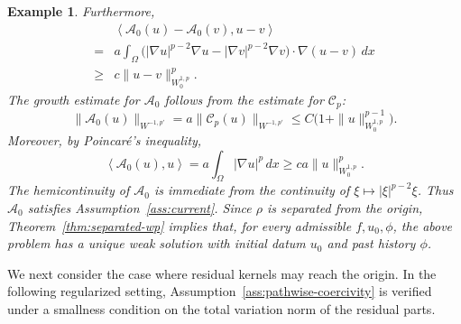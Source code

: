 \documentclass[a4paper,11pt,oneside,reqno]{amsart}
\newtheorem{example}[theorem]{Example}
\newcounter{c}
\newcounter{d}
\newcounter{b}
\newcommand{\dual}[2]{\left\langle #1,#2\right\rangle}
\begin{document}
\begin{example}
Furthermore,
\[
\begin{aligned}
&\dual{\mathcal A_0(u)-\mathcal A_0(v)}{u-v}  \\
={}&
 a\int_\Omega
 \bigl(
 |\nabla u|^{p-2}\nabla u
 -
 |\nabla v|^{p-2}\nabla v
 \bigr)\cdot\nabla(u-v)\,dx  \\
\ge{}&
c\|u-v\|_{W^{1,p}_0}^{p}.
\end{aligned}
\]
The growth estimate for \(\mathcal A_0\) follows from the estimate for
\(\mathcal C_p\):
\[
 \|\mathcal A_0(u)\|_{W^{-1,p'}}
 =
 a\|\mathcal C_p(u)\|_{W^{-1,p'}}
 \le
 C\bigl(1+\|u\|_{W^{1,p}_0}^{p-1}\bigr).
\]
Moreover, by Poincaré's inequality,
\[
 \dual{\mathcal A_0(u)}{u}
 =
 a\int_\Omega |\nabla u|^p\,dx
 \ge
 c a\|u\|_{W^{1,p}_0}^p .
\]
The hemicontinuity of \(\mathcal A_0\) is immediate from the continuity of
\(\xi\mapsto |\xi|^{p-2}\xi\). Thus \(\mathcal A_0\) satisfies
Assumption~\ref{ass:current}. Since \(\rho\) is separated from the origin, Theorem~\ref{thm:separated-wp}
implies that, for every admissible \(f,u_0,\phi\), the above problem has
a unique weak solution with initial datum \(u_0\) and past history
\(\phi\).
\end{example}

We next consider the case where residual kernels may reach the origin.
In the following regularized setting, Assumption~\ref{ass:pathwise-coercivity}
is verified under a smallness condition on the total variation norm of the
residual parts.
\end{document}
